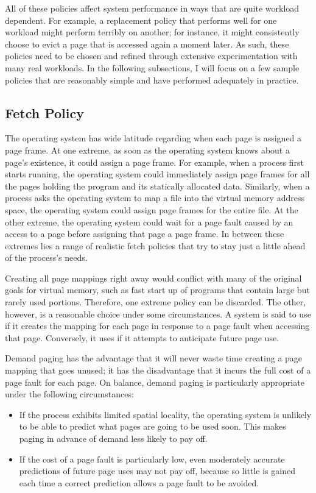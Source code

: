 All of these policies affect system performance in ways that are quite
workload dependent.  For example, a replacement policy that performs well
for one workload might perform terribly on another; for instance, it might consistently choose to
evict a page that is accessed again a moment later.  As such, these
policies need to be chosen and refined through extensive
experimentation with many real workloads.  In the following
subsections, I will focus on a few sample policies that are
reasonably simple and have performed adequately in practice.

\subsection{Fetch Policy}
\label{fetch-policy}

The operating system has wide latitude regarding when each page is
assigned a page frame.  At one extreme, as soon as the operating
system knows about a page's existence, it could assign a page frame.
For example, when a process first starts running, the operating system
could immediately assign page frames for all the pages holding the
program and its statically allocated data.  Similarly, when a process
asks the operating system to map a file into the virtual memory
address space, the operating system could assign page frames for the
entire file.  At the other extreme, the operating system could wait
for a page fault caused by an access to a page before assigning that
page a page frame.  In between these extremes lies a range of realistic
fetch policies that try to stay just a little ahead of the process's
needs.

Creating all page mappings right away would conflict with many of the
original goals for virtual memory, such as fast start up of programs
that contain large but rarely used portions.  Therefore,
one extreme policy can be discarded.  The other, however, is a reasonable
choice under some circumstances.  A system is said to use
 if it creates the mapping for each page in
response to a page fault when accessing that page.  Conversely, it
uses  if it attempts to anticipate future page use.

Demand paging has the advantage that it will never waste time creating
a page mapping that goes unused; it has the disadvantage that it
incurs the full cost of a page fault for each page.  On balance, demand paging is
particularly appropriate under the following circumstances:
\begin{itemize}
\item
If the process exhibits limited spatial locality, the operating system
is unlikely to be able to predict what pages are going to be used
soon.  This makes paging in advance of demand less likely to pay off.
\item
If the cost of a page fault is particularly low, even moderately
accurate predictions of future page uses may not pay off, because so
little is gained each time a correct prediction allows a page fault to
be avoided.
\end{itemize}

